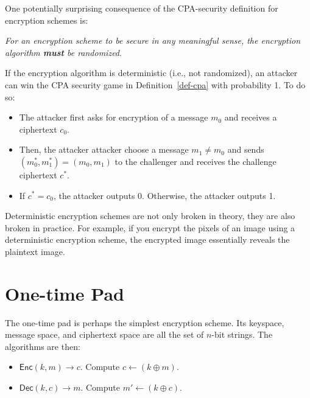 \documentclass[
  letterpaper,
]{scrbook}
\providecommand{\tightlist}{%
  \setlength{\itemsep}{0pt}\setlength{\parskip}{0pt}}
\newcommand{\Enc}{\mathsf{Enc}}
\newcommand{\Dec}{\mathsf{Dec}}
\theoremstyle{definition}
\theoremstyle{plain}
\theoremstyle{plain}
\theoremstyle{remark}
\begin{document}
One potentially surprising consequence of the CPA-security definition
for encryption schemes is:

\emph{For an encryption scheme to be secure in any meaningful sense, the
encryption algorithm \textbf{must} be randomized}.


If the encryption algorithm is deterministic (i.e., not randomized), an
attacker can win the CPA security game in Definition~\ref{def-cpa} with
probability 1. To do so:

\begin{itemize}
\tightlist
\item
  The attacker first asks for encryption of a message \(m_0\) and
  receives a ciphertext \(c_0\).
\item
  Then, the attacker attacker choose a message \(m_1 \neq m_0\) and
  sends \((m^*_0, m^*_1) = (m_0, m_1)\) to the challenger and receives
  the challenge ciphertext \(c^*\).
\item
  If \(c^* = c_0\), the attacker outputs 0. Otherwise, the attacker
  outputs 1.
\end{itemize}

Deterministic encryption schemes are not only broken in theory, they are
also broken in practice. For example, if you encrypt the pixels of an
image using a deterministic encryption scheme, the encrypted image
essentially reveals the plaintext image.

\section{One-time Pad}\label{one-time-pad}

The one-time pad is perhaps the simplest encryption scheme. Its
keyspace, message space, and ciphertext space are all the set of
\(n\)-bit strings. The algorithms are then:

\begin{itemize}
\tightlist
\item
  \(\Enc(k, m) \to c\). Compute \(c \gets (k \oplus m)\).
\item
  \(\Dec(k, c) \to m\). Compute \(m' \gets (k \oplus c)\).
\end{itemize}
\end{document}
